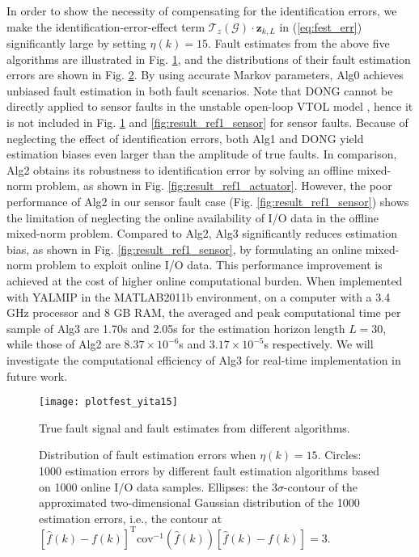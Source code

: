 \documentclass[twocolumn]{autart}
\begin{document}
In order to show the necessity of compensating for the identification errors, we make the identification-error-effect term $\mathcal{T}_z \left( \mathcal{G} \right) \cdot \mathbf{z}_{k,L}$
in (\ref{eq:fest_err}) significantly large by setting $\eta(k) = 15$. Fault estimates from the above five algorithms are illustrated in Fig. \ref{fig:plotfest}, and the distributions of their fault estimation errors are shown in Fig. \ref{fig:result_ref1}.
By using accurate Markov parameters, Alg0 achieves unbiased fault estimation in both fault scenarios. Note that DONG cannot be directly applied to sensor faults in the unstable open-loop VTOL model \cite{Dong2012c}, hence it is not included in Fig. \ref{fig:plotfest} and \ref{fig:result_ref1_sensor} for sensor faults.
Because of neglecting the effect of identification errors, both Alg1 and DONG yield estimation biases even larger than the amplitude of true faults. In comparison, Alg2 obtains its robustness to identification error by solving an offline mixed-norm  problem, as shown in Fig. \ref{fig:result_ref1_actuator}. However, the poor performance of Alg2 in our sensor fault case (Fig. \ref{fig:result_ref1_sensor}) shows the limitation of neglecting the online availability of I/O data in the offline mixed-norm problem. 
Compared to Alg2, Alg3 significantly reduces estimation bias, as shown in Fig. \ref{fig:result_ref1_sensor}, by formulating an online mixed-norm problem to exploit online I/O data. This performance improvement is achieved at the cost of higher online computational burden. When implemented with YALMIP \cite{Lofberg2004} in the MATLAB2011b environment, on a computer with a 3.4 GHz processor and 8 GB RAM, the averaged and peak computational time per sample of Alg3 are 1.70s and 2.05s for the estimation horizon length $L=30$, while those of Alg2 are $8.37 \times 10^{-6}$s and $3.17 \times 10^{-5}$s respectively. We will investigate the computational efficiency of Alg3 for real-time implementation in future work.

\begin{figure}[h]
	\centering
	\texttt{[image: plotfest\_yita15]}
	\caption{True fault signal and fault estimates from different algorithms.}
	\label{fig:plotfest}
\end{figure}



\begin{figure}[h]
\centering
{}
\caption{Distribution of fault estimation errors when $\eta(k)=15$. Circles: 1000 estimation errors by different fault estimation algorithms based on 1000 online I/O data samples. Ellipses: the $3\sigma$-contour of the approximated two-dimensional Gaussian distribution of the 1000 estimation errors, i.e., the contour at $\left[ \hat f(k) - f(k) \right]^\mathrm{T} {\text{cov}^{-1} \left( \hat f(k) \right)}
\left[ \hat f(k) - f(k) \right] = 3$.}
\label{fig:result_ref1}
\end{figure}
\end{document}
